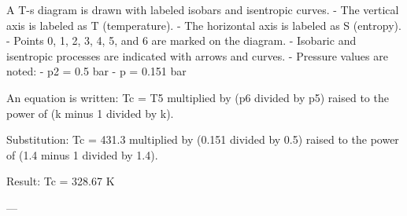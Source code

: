 A T-s diagram is drawn with labeled isobars and isentropic curves.  
- The vertical axis is labeled as T (temperature).  
- The horizontal axis is labeled as S (entropy).  
- Points 0, 1, 2, 3, 4, 5, and 6 are marked on the diagram.  
- Isobaric and isentropic processes are indicated with arrows and curves.  
- Pressure values are noted:  
  - p2 = 0.5 bar  
  - p = 0.151 bar  

An equation is written:  
Tc = T5 multiplied by (p6 divided by p5) raised to the power of (k minus 1 divided by k).  

Substitution:  
Tc = 431.3 multiplied by (0.151 divided by 0.5) raised to the power of (1.4 minus 1 divided by 1.4).  

Result:  
Tc = 328.67 K  

---